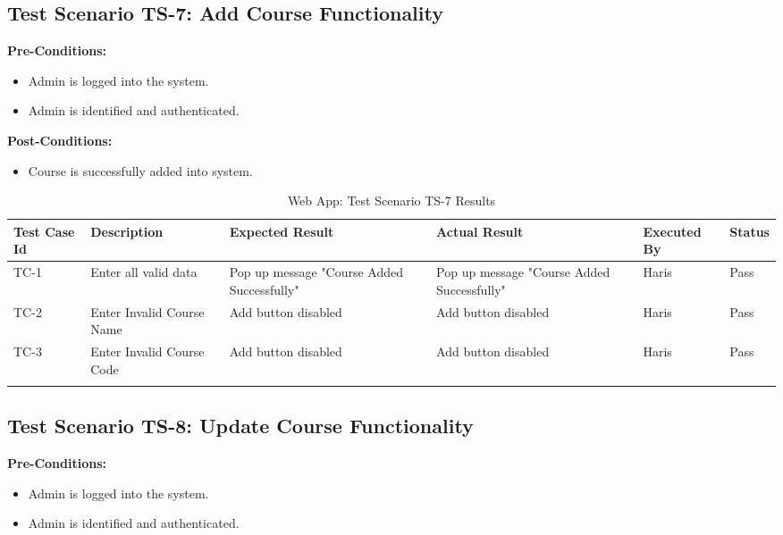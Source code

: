 \subsection{Test Scenario TS-7: Add Course Functionality}

\textbf{Pre-Conditions: } 
\begin{itemize}

\item Admin is logged into the system.
\item Admin is identified and authenticated.

\end{itemize}

\textbf{Post-Conditions: }
\begin{itemize}
\item Course is successfully added into system.
\end{itemize}

\begin{longtable}{|p{1cm}|p{3cm}|p{2cm}|p{2cm}|p{2cm}|p{2cm}|}
\hline
\textbf{Test Case Id} & \textbf{Description} & \textbf{Expected Result} & \textbf{Actual Result} & \textbf{Executed By} & \textbf{Status}\\
\hline
TC-1 &
Enter all valid data &
Pop up message "Course Added Successfully" &
Pop up message "Course Added Successfully" &
Haris &
Pass \\
\hline


TC-2 &
Enter Invalid Course Name &
Add button disabled &
Add button disabled &
Haris &
Pass \\
\hline

TC-3 &
Enter Invalid Course Code &
Add button disabled &
Add button disabled &
Haris &
Pass \\
\hline

\caption{Web App: Test Scenario TS-7 Results}
\end{longtable}




\subsection{Test Scenario TS-8: Update Course Functionality}

\textbf{Pre-Conditions: } 
\begin{itemize}

\item Admin is logged into the system.
\item Admin is identified and authenticated.

\end{itemize}


